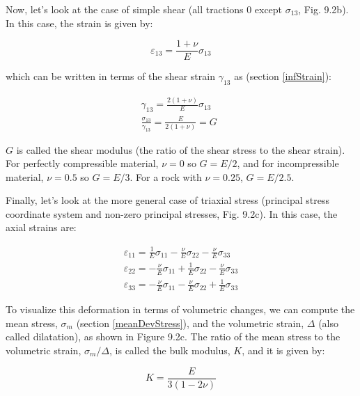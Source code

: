 \documentclass[a4paper , 12pt]{book}
\begin{document}
Now, let's look at the case of simple shear (all tractions 0 except $\sigma_{13}$, Fig. 9.2b). In this case, the strain is given by:

\begin{equation}
    \varepsilon_{13}=\frac{1+\nu}{E}\sigma_{13}
\end{equation}

which can be written in terms of the shear strain $\gamma_{13}$ as (section \ref{infStrain}):

\begin{equation}\label{eq9.4}
    \begin{gathered}
        \gamma_{13}=\frac{2(1+\nu)}{E}\sigma_{13}\quad \\
        \frac{\sigma_{13}}{\gamma_{13}}=\frac{E}{2(1+\nu)}=G
    \end{gathered}
\end{equation}

$G$ is called the shear modulus (the ratio of the shear stress to the shear strain). For perfectly compressible material, $\nu=0$ so $G=E/2$, and for incompressible material, $\nu=0.5$ so $G=E/3$. For a rock with $\nu=0.25$, $G=E/2.5$.

Finally, let's look at the more general case of triaxial stress (principal stress coordinate system and non-zero principal stresses, Fig. 9.2c). In this case, the axial strains are:

\begin{equation}
    \begin{gathered}
        \varepsilon_{11}=\frac{1}{E}\sigma_{11}-\frac{\nu}{E}\sigma_{22}-\frac{\nu}{E}\sigma_{33} \\
        \varepsilon_{22}=-\frac{\nu}{E}\sigma_{11}+\frac{1}{E}\sigma_{22}-\frac{\nu}{E}\sigma_{33} \\
        \varepsilon_{33}=-\frac{\nu}{E}\sigma_{11}-\frac{\nu}{E}\sigma_{22}+\frac{1}{E}\sigma_{33}
    \end{gathered}
\end{equation}

To visualize this deformation in terms of volumetric changes, we can compute the mean stress, $\sigma_m$ (section \ref{meanDevStress}), and the volumetric strain, $\Delta$ (also called dilatation), as shown in Figure 9.2c. The ratio of the mean stress to the volumetric strain, $\sigma_m/\Delta$, is called the bulk modulus, $K$, and it is given by:

\begin{equation}
    K=\frac{E}{3(1-2\nu)}
\end{equation}
\end{document}
